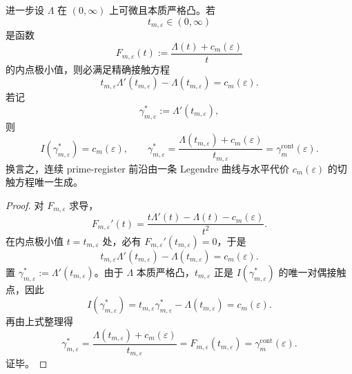 \begin{theorem}\label{thm:conclusion-continuous-legendre-euler-fenchel-contact}
进一步设 \(\Lambda\) 在 \((0,\infty)\) 上可微且本质严格凸。若
\[
t_{m,\varepsilon}\in(0,\infty)
\]
是函数
\[
F_{m,\varepsilon}(t):=\frac{\Lambda(t)+c_m(\varepsilon)}{t}
\]
的内点极小值，则必满足精确接触方程
\[
t_{m,\varepsilon}\Lambda'(t_{m,\varepsilon})-\Lambda(t_{m,\varepsilon})
=
c_m(\varepsilon).
\]
若记
\[
\gamma_{m,\varepsilon}^{\ast}:=\Lambda'(t_{m,\varepsilon}),
\]
则
\[
I(\gamma_{m,\varepsilon}^{\ast})=c_m(\varepsilon),
\qquad
\gamma_{m,\varepsilon}^{\ast}
=
\frac{\Lambda(t_{m,\varepsilon})+c_m(\varepsilon)}{t_{m,\varepsilon}}
=
\gamma_m^{\mathrm{cont}}(\varepsilon).
\]
换言之，连续 prime-register 前沿由一条 Legendre 曲线与水平代价 \(c_m(\varepsilon)\) 的切触方程唯一生成。
\end{theorem}
\begin{proof}
对 \(F_{m,\varepsilon}\) 求导，
\[
F_{m,\varepsilon}'(t)
=
\frac{t\Lambda'(t)-\Lambda(t)-c_m(\varepsilon)}{t^2}.
\]
在内点极小值 \(t=t_{m,\varepsilon}\) 处，必有 \(F_{m,\varepsilon}'(t_{m,\varepsilon})=0\)，于是
\[
t_{m,\varepsilon}\Lambda'(t_{m,\varepsilon})-\Lambda(t_{m,\varepsilon})
=
c_m(\varepsilon).
\]
置 \(\gamma_{m,\varepsilon}^{\ast}:=\Lambda'(t_{m,\varepsilon})\)。由于 \(\Lambda\) 本质严格凸，\(t_{m,\varepsilon}\) 正是 \(I(\gamma_{m,\varepsilon}^{\ast})\) 的唯一对偶接触点，因此
\[
I(\gamma_{m,\varepsilon}^{\ast})
=
t_{m,\varepsilon}\gamma_{m,\varepsilon}^{\ast}-\Lambda(t_{m,\varepsilon})
=
c_m(\varepsilon).
\]
再由上式整理得
\[
\gamma_{m,\varepsilon}^{\ast}
=
\frac{\Lambda(t_{m,\varepsilon})+c_m(\varepsilon)}{t_{m,\varepsilon}}
=
F_{m,\varepsilon}(t_{m,\varepsilon})
=
\gamma_m^{\mathrm{cont}}(\varepsilon).
\]
证毕。
\end{proof}

